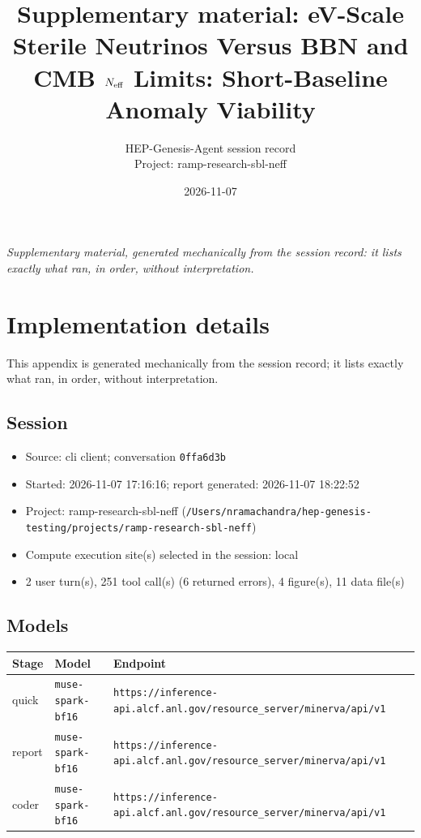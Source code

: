 \documentclass[11pt,a4paper]{article}
\title{Supplementary material: eV-Scale Sterile Neutrinos Versus BBN and CMB $N_{\rm eff}$ Limits: Short-Baseline Anomaly Viability}
\author{HEP-Genesis-Agent session record \\ \small Project: ramp-research-sbl-neff}
\date{2026-11-07}
\begin{document}
\maketitle
\noindent\textit{\small Supplementary material, generated mechanically from the session record: it lists exactly what ran, in order, without interpretation.}
\vspace{1em}



\appendix
\section{Implementation details}
\label{app:impl}
This appendix is generated mechanically from the session record; it lists exactly what ran, in order, without interpretation.
\subsection{Session}
\begin{itemize}
  \item Source: cli client; conversation \texttt{0ffa6d3b}
  \item Started: 2026-11-07 17:16:16; report generated: 2026-11-07 18:22:52
  \item Project: ramp-research-sbl-neff (\texttt{/\allowbreak{}Users/\allowbreak{}nramachandra/\allowbreak{}hep-genesis-testing/\allowbreak{}projects/\allowbreak{}ramp-research-sbl-neff})
  \item Compute execution site(s) selected in the session: local
  \item 2 user turn(s), 251 tool call(s) (6 returned errors), 4 figure(s), 11 data file(s)
\end{itemize}
\subsection{Models}
\begin{longtable}{@{}p{}p{}p{}@{}}
\toprule Stage & Model & Endpoint \\ \midrule \endhead
quick & \texttt{muse-spark-bf16} & \texttt{https:\allowbreak{}/\allowbreak{}/\allowbreak{}inference-api.alcf.anl.gov/\allowbreak{}resource\_\allowbreak{}server/\allowbreak{}minerva/\allowbreak{}api/\allowbreak{}v1} \\
report & \texttt{muse-spark-bf16} & \texttt{https:\allowbreak{}/\allowbreak{}/\allowbreak{}inference-api.alcf.anl.gov/\allowbreak{}resource\_\allowbreak{}server/\allowbreak{}minerva/\allowbreak{}api/\allowbreak{}v1} \\
coder & \texttt{muse-spark-bf16} & \texttt{https:\allowbreak{}/\allowbreak{}/\allowbreak{}inference-api.alcf.anl.gov/\allowbreak{}resource\_\allowbreak{}server/\allowbreak{}minerva/\allowbreak{}api/\allowbreak{}v1} \\
\bottomrule\end{longtable}
\end{document}
